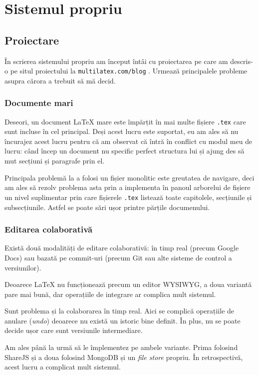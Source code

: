 \documentclass[a4wide,12pt]{report}
\newcommand{\eng}[1]{\emph{#1}} %
\newcommand{\cod}[1]{\texttt{#1}}
\begin{document}
\chapter{Sistemul propriu}

\section{Proiectare}

În scrierea sistemului propriu am început întâi cu proiectarea pe care am
descris-o pe situl proiectului la \cod{multilatex.com/blog} . Urmează
principalele probleme asupra cărora a trebuit să mă decid.

\subsection{Documente mari}

Deseori, un document \LaTeX{} mare este împărțit în mai multe fișiere \cod{.tex}
care sunt incluse în cel principal. Deși acest lucru este suportat, eu am ales
să nu încurajez acest lucru pentru că am observat că întră în conflict cu modul
meu de lucru: când încep un document nu specific perfect structura lui și ajung
des să mut secțiuni și paragrafe prin el.

Principala problemă la a folosi un fișier monolitic este greutatea de navigare,
deci am ales să rezolv problema asta prin a implementa în panoul arborelui de
fișiere un nivel suplimentar prin care fișierele \cod{.tex} listează toate
capitolele, secțiunile și subsecțiunile. Astfel se poate sări ușor printre
părțile documenului.

\subsection{Editarea colaborativă}

Există două modalități de editare colaborativă: în timp real (precum Google
Docs) sau bazată pe commit-uri (precum Git sau alte sisteme de control a
versiunilor).

Deoarece \LaTeX{} nu funcționează precum un editor WYSIWYG, a doua variantă pare
mai bună, dar operațiile de integrare ar complica mult sistemul.

Sunt problema și la colaborarea în timp real. Aici se complică operațiile de
anulare (\eng{undo}) deoarece nu există un istoric bine definit. În plus, nu se
poate decide ușor care sunt versiunile intermediare.

Am ales până la urmă să le împlementez pe ambele variante. Prima folosind
ShareJS și a doua folosind MongoDB și un \eng{file store} propriu. În
retrospectivă, acest lucru a complicat mult sistemul.
\end{document}
